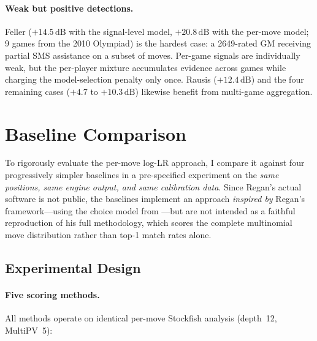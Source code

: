 \documentclass[11pt,a4paper]{article}
\newcommand{\dB}{\,\mathrm{dB}}
\theoremstyle{definition}
\begin{document}
\paragraph{Weak but positive detections.}
Feller ($+14.5\dB$ with the signal-level model, $+20.8\dB$ with the
per-move model; 9 games from the 2010 Olympiad) is the hardest
case: a 2649-rated GM receiving partial SMS assistance on a subset of
moves.  Per-game signals are individually weak, but the per-player
mixture accumulates evidence across games while charging the
model-selection penalty only once.  Rausis ($+12.4\dB$) and the four
remaining cases ($+4.7$ to $+10.3\dB$) likewise benefit from
multi-game aggregation.


\section{Baseline Comparison}
\label{sec:synthetic}

To rigorously evaluate the per-move log-LR approach, I compare it
against four progressively simpler baselines in a pre-specified
experiment on the \emph{same positions, same engine output, and same
calibration data}.  Since Regan's actual software is not public, the
baselines implement an approach \emph{inspired by} Regan's
framework---using the choice model from ---but are
not intended as a faithful reproduction of his full methodology,
which scores the complete multinomial move distribution rather than
top-1 match rates alone.

\subsection{Experimental Design}
\label{sec:synth-design}

\paragraph{Five scoring methods.}
All methods operate on identical per-move Stockfish analysis
(depth~12, MultiPV~5):
\end{document}
